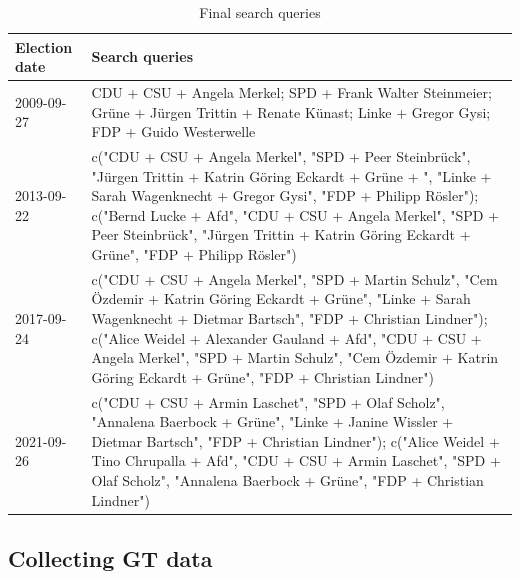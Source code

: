 \documentclass[
  letterpaper,
  DIV=11,
  numbers=noendperiod]{scrartcl}
\begin{document}
\hypertarget{tbl-2}{}
\begin{table}
\caption{\label{tbl-2}Final search queries }\tabularnewline

\centering\begingroup\fontsize{10}{12}\selectfont

\begin{tabular}{l>{\raggedright\arraybackslash}p{5in}}
\toprule
Election date & Search queries\\
\midrule
2009-09-27 & CDU + CSU + Angela Merkel; SPD + Frank Walter Steinmeier; Grüne + Jürgen Trittin + Renate Künast; Linke + Gregor Gysi; FDP + Guido Westerwelle\\
2013-09-22 & c("CDU + CSU + Angela Merkel", "SPD + Peer Steinbrück", "Jürgen Trittin + Katrin Göring Eckardt + Grüne + ", "Linke + Sarah Wagenknecht + Gregor Gysi", "FDP + Philipp Rösler"); c("Bernd Lucke + Afd", "CDU + CSU + Angela Merkel", "SPD + Peer Steinbrück", "Jürgen Trittin + Katrin Göring Eckardt + Grüne", "FDP + Philipp Rösler")\\
2017-09-24 & c("CDU + CSU + Angela Merkel", "SPD + Martin Schulz", "Cem Özdemir + Katrin Göring Eckardt + Grüne", "Linke + Sarah Wagenknecht + Dietmar Bartsch", "FDP + Christian Lindner"); c("Alice Weidel + Alexander Gauland + Afd", "CDU + CSU + Angela Merkel", "SPD + Martin Schulz", "Cem Özdemir + Katrin Göring Eckardt + Grüne", "FDP + Christian Lindner")\\
2021-09-26 & c("CDU + CSU + Armin Laschet", "SPD + Olaf Scholz", "Annalena Baerbock + Grüne", "Linke + Janine Wissler + Dietmar Bartsch", "FDP + Christian Lindner"); c("Alice Weidel + Tino Chrupalla + Afd", "CDU + CSU + Armin Laschet", "SPD + Olaf Scholz", "Annalena Baerbock + Grüne", "FDP + Christian Lindner")\\
\bottomrule
\end{tabular}
\endgroup{}
\end{table}

\hypertarget{sec-gtdatacollection}{%
\subsection{Collecting GT data}\label{sec-gtdatacollection}}
\end{document}
